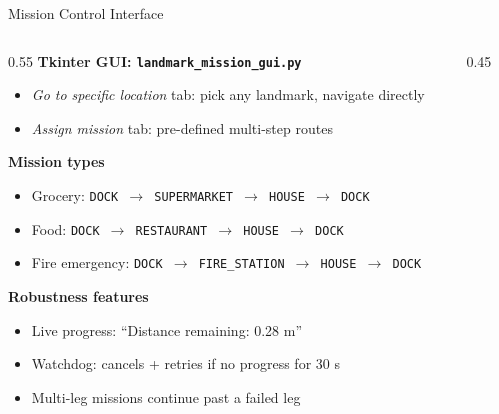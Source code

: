 \documentclass[10pt,aspectratio=169]{beamer}
\begin{document}
\begin{frame}{Mission Control Interface}
  \begin{columns}[T]
    \begin{column}{0.55\textwidth}
      \textbf{Tkinter GUI: \texttt{landmark\_mission\_gui.py}}
      \begin{itemize}
        \item \textit{Go to specific location} tab: pick any landmark, navigate directly
        \item \textit{Assign mission} tab: pre-defined multi-step routes
      \end{itemize}
      \vspace{0.4em}
      \textbf{Mission types}
      \begin{itemize}
        \item Grocery: \texttt{DOCK $\rightarrow$ SUPERMARKET $\rightarrow$ HOUSE $\rightarrow$ DOCK}
        \item Food: \texttt{DOCK $\rightarrow$ RESTAURANT $\rightarrow$ HOUSE $\rightarrow$ DOCK}
        \item Fire emergency: \texttt{DOCK $\rightarrow$ FIRE\_STATION $\rightarrow$ HOUSE $\rightarrow$ DOCK}
      \end{itemize}
      \vspace{0.4em}
      \textbf{Robustness features}
      \begin{itemize}
        \item Live progress: ``Distance remaining: 0.28 m''
        \item Watchdog: cancels + retries if no progress for 30 s
        \item Multi-leg missions continue past a failed leg
      \end{itemize}
    \end{column}
    \begin{column}{0.45\textwidth}
      \centering
    \end{column}
  \end{columns}
\end{frame}
\end{document}
